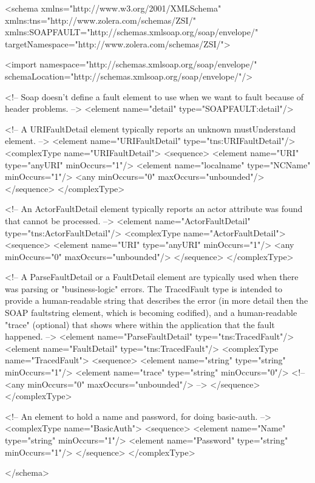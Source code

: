 
<schema xmlns="http://www.w3.org/2001/XMLSchema"
  xmlns:tns="http://www.zolera.com/schemas/ZSI/"
  xmlns:SOAPFAULT="http://schemas.xmlsoap.org/soap/envelope/"
  targetNamespace="http://www.zolera.com/schemas/ZSI/">

  <import namespace="http://schemas.xmlsoap.org/soap/envelope/"
    schemaLocation="http://schemas.xmlsoap.org/soap/envelope/"/>

  <!--  Soap doesn't define a fault element to use when we want
        to fault because of header problems. -->
  <element name="detail" type="SOAPFAULT:detail"/>

  <!--  A URIFaultDetail element typically reports an unknown
        mustUnderstand element. -->
  <element name="URIFaultDetail" type="tns:URIFaultDetail"/>
  <complexType name="URIFaultDetail">
    <sequence>
      <element name="URI" type="anyURI" minOccurs="1"/>
      <element name="localname" type="NCName" minOccurs="1"/>
      <any minOccurs="0" maxOccurs="unbounded"/>
    </sequence>
  </complexType>

  <!--  An ActorFaultDetail element typically reports an actor
        attribute was found that cannot be processed. -->
  <element name="ActorFaultDetail" type="tns:ActorFaultDetail"/>
  <complexType name="ActorFaultDetail">
    <sequence>
      <element name="URI" type="anyURI" minOccurs="1"/>
      <any minOccurs="0" maxOccurs="unbounded"/>
    </sequence>
  </complexType>

  <!--  A ParseFaultDetail or a FaultDetail element are typically
        used when there was parsing or "business-logic" errors.
        The TracedFault type is intended to provide a human-readable
        string that describes the error (in more detail then the
        SOAP faultstring element, which is becoming codified),
        and a human-readable "trace" (optional) that shows where
        within the application that the fault happened. -->
  <element name="ParseFaultDetail" type="tns:TracedFault"/>
  <element name="FaultDetail" type="tns:TracedFault"/>
  <complexType name="TracedFault">
    <sequence>
      <element name="string" type="string" minOccurs="1"/>
      <element name="trace" type="string" minOccurs="0"/>
      <!-- <any minOccurs="0" maxOccurs="unbounded"/> -->
    </sequence>
  </complexType>

  <!--  An element to hold a name and password, for doing basic-auth. -->
  <complexType name="BasicAuth">
    <sequence>
      <element name="Name" type="string" minOccurs="1"/>
      <element name="Password" type="string" minOccurs="1"/>
    </sequence>
  </complexType>

</schema>
